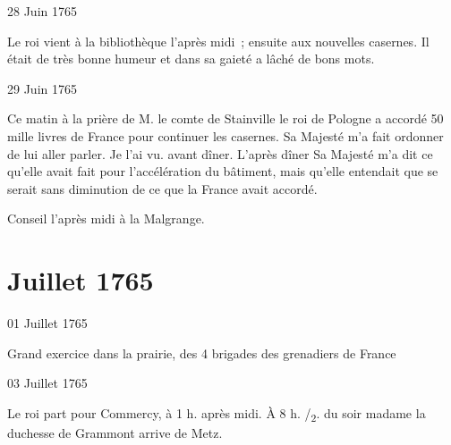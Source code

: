                      \begin{diary}{28 Juin 1765}{}
                        
                        
                           Le roi vient à la bibliothèque l'après midi ; ensuite
                           aux nouvelles casernes. Il était de très bonne
                           humeur et dans sa gaieté a lâché de bons mots. \bigskip
        
        
                     \end{diary}

                     \begin{diary}{29 Juin 1765}{}
                        
                         Ce matin à la prière de M. le comte de
                              Stainville
                           le roi de Pologne a accordé 50 mille livres
                              de France pour continuer les casernes. Sa Majesté m'a
                           fait ordonner de lui aller parler. Je l'ai vu.
                           avant dîner. L'après dîner Sa Majesté m'a dit
                           ce qu'elle avait fait pour l'accélération du
                           bâtiment, mais qu'elle entendait que se serait sans diminution de ce que la France avait
                           accordé. \bigskip
        
        
                         Conseil l'après midi à la Malgrange. \bigskip
        
        
                     \end{diary}
                  \chapter*{Juillet 1765}
                     
                     
                     \begin{diary}{01 Juillet 1765}{}
                        
                         Grand exercice dans la prairie, des
                           4 brigades des grenadiers de France
                        \bigskip
        
        
                     \end{diary}

                     \begin{diary}{03 Juillet 1765}{}
                        
                        
                           Le roi part pour Commercy, à 1 h.
                           après midi. À 8 h. /\textsubscript{2}. du
                           soir madame la
                              duchesse de Grammont arrive de Metz. \bigskip
        
        
                     \end{diary}

